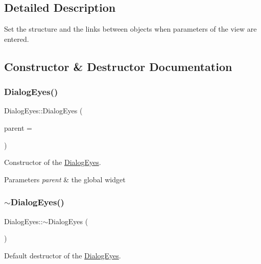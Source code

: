 \subsection{Detailed Description}
Set the structure and the links between objects when parameters of the view are entered. 

\subsection{Constructor \& Destructor Documentation}
\hypertarget{class_dialog_eyes_a97beed52342196a6063d41f03dd63953}{}\label{class_dialog_eyes_a97beed52342196a6063d41f03dd63953} 
\subsubsection{\texorpdfstring{Dialog\+Eyes()}{DialogEyes()}}
{\footnotesize\ttfamily Dialog\+Eyes\+::\+Dialog\+Eyes (\begin{DoxyParamCaption}\item[{Q\+Widget $\ast$}]{parent = {} }\end{DoxyParamCaption})\hspace{0.3cm}{\ttfamily [explicit]}}



Constructor of the \hyperlink{class_dialog_eyes}{Dialog\+Eyes}. 


\begin{DoxyParams}{Parameters}
{\em parent} & the global widget \\
\hline
\end{DoxyParams}
\hypertarget{class_dialog_eyes_a751e612833e5556f5c53dfc4875ef252}{}\label{class_dialog_eyes_a751e612833e5556f5c53dfc4875ef252} 
\subsubsection{\texorpdfstring{$\sim$\+Dialog\+Eyes()}{~DialogEyes()}}
{\footnotesize\ttfamily Dialog\+Eyes\+::$\sim$\+Dialog\+Eyes (\begin{DoxyParamCaption}{ }\end{DoxyParamCaption})}



Default destructor of the \hyperlink{class_dialog_eyes}{Dialog\+Eyes}. 



